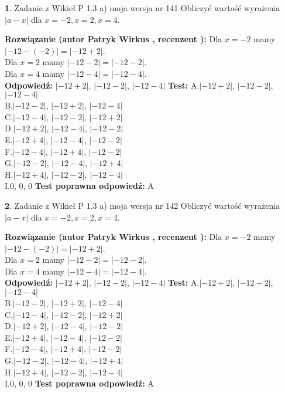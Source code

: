 \documentclass[12pt, a4paper]{article}
\theoremstyle{definition} %
\newtheorem{zad}{}
\newcommand{\zadStart}[1]{\begin{zad}#1\newline}
\newcommand{\zadStop}{\end{zad}}
\newcommand{\rozwStart}[2]{\noindent \textbf{Rozwiązanie (autor #1 , recenzent #2): }\newline}
\newcommand{\rozwStop}{\newline}
\newcommand{\odpStart}{\noindent \textbf{Odpowiedź:}\newline}
\newcommand{\odpStop}{\newline}
\newcommand{\testStart}{\noindent \textbf{Test:}\newline}
\newcommand{\testStop}{\newline}
\newcommand{\kluczStart}{\noindent \textbf{Test poprawna odpowiedź:}\newline}
\newcommand{\kluczStop}{\newline}
\begin{document}
\zadStart{Zadanie z Wikieł P 1.3 a) moja wersja nr 141}
Obliczyć wartość wyrażenia $|a - x|$ dla $x=-2,x=2,x=4$.
\zadStop
\rozwStart{Patryk Wirkus}{}
Dla $x = -2$ mamy $|-12 - (-2)| = |-12 + 2|$.\\
Dla $x = 2$ mamy $|-12 - 2| = |-12 - 2|$.\\
Dla $x = 4$ mamy $|-12 - 4| = |-12 - 4|$.\\
\rozwStop
\odpStart
$|-12 + 2|$, $|-12 - 2|$, $|-12 - 4|$
\odpStop
\testStart
A.$|-12 + 2|$, $|-12 - 2|$, $|-12 - 4|$\\
B.$|-12 - 2|$, $|-12 + 2|$, $|-12 - 4|$\\
C.$|-12 - 4|$, $|-12 - 2|$, $|-12 + 2|$\\
D.$|-12 + 2|$, $|-12 - 4|$, $|-12 - 2|$\\
E.$|-12 + 4|$, $|-12 - 4|$, $|-12 - 2|$\\
F.$|-12 - 4|$, $|-12 + 4|$, $|-12 - 2|$\\
G.$|-12 - 2|$, $|-12 - 4|$, $|-12 + 4|$\\
H.$|-12 + 4|$, $|-12 - 2|$, $|-12 - 4|$\\
I.$0$, $0$, $0$
\testStop
\kluczStart
A
\kluczStop



\zadStart{Zadanie z Wikieł P 1.3 a) moja wersja nr 142}
Obliczyć wartość wyrażenia $|a - x|$ dla $x=-2,x=2,x=4$.
\zadStop
\rozwStart{Patryk Wirkus}{}
Dla $x = -2$ mamy $|-12 - (-2)| = |-12 + 2|$.\\
Dla $x = 2$ mamy $|-12 - 2| = |-12 - 2|$.\\
Dla $x = 4$ mamy $|-12 - 4| = |-12 - 4|$.\\
\rozwStop
\odpStart
$|-12 + 2|$, $|-12 - 2|$, $|-12 - 4|$
\odpStop
\testStart
A.$|-12 + 2|$, $|-12 - 2|$, $|-12 - 4|$\\
B.$|-12 - 2|$, $|-12 + 2|$, $|-12 - 4|$\\
C.$|-12 - 4|$, $|-12 - 2|$, $|-12 + 2|$\\
D.$|-12 + 2|$, $|-12 - 4|$, $|-12 - 2|$\\
E.$|-12 + 4|$, $|-12 - 4|$, $|-12 - 2|$\\
F.$|-12 - 4|$, $|-12 + 4|$, $|-12 - 2|$\\
G.$|-12 - 2|$, $|-12 - 4|$, $|-12 + 4|$\\
H.$|-12 + 4|$, $|-12 - 2|$, $|-12 - 4|$\\
I.$0$, $0$, $0$
\testStop
\kluczStart
A
\kluczStop
\end{document}
